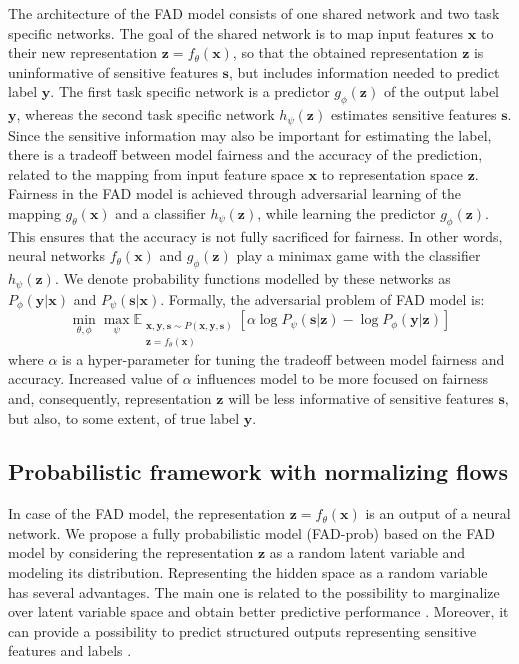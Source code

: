 \documentclass[preprint,12pt]{elsarticle}
\begin{document}
The architecture of the FAD model consists of one shared network and two task specific networks. The goal of the shared network is to map input features $\mathbf{x}$ to their new representation $\mathbf{z}=f_\theta(\mathbf{x})$, so that the obtained representation $\mathbf{z}$ is uninformative of sensitive features $\mathbf{s}$, but includes information needed to predict label $\mathbf{y}$. The first task specific network is a predictor $g_\phi(\mathbf{z})$ of the output label $\mathbf{y}$, whereas the second task specific network $h_\psi(\mathbf{z})$ estimates sensitive features $\mathbf{s}$. Since the sensitive information may also be important for estimating the label, there is a tradeoff between model fairness and the accuracy of the prediction, related to the mapping from input feature space $\mathbf{x}$ to representation space $\mathbf{z}$.
Fairness in the FAD model is achieved through adversarial learning of the mapping $g_\theta(\mathbf{x})$ and a classifier $h_\psi(\mathbf{z})$, while learning the predictor $g_\phi(\mathbf{z})$. This ensures that the accuracy is not fully sacrificed for fairness. In other words, neural networks $f_\theta(\mathbf{x})$ and $g_\phi(\mathbf{z})$ play a minimax game with the classifier $h_\psi(\mathbf{z})$. We denote probability functions modelled by these networks as $P_\phi(\mathbf{y}|\mathbf{x})$ and $P_\psi(\mathbf{s}|\mathbf{x})$. Formally, the adversarial problem of FAD model is:
$$\min_{\theta,\phi}\max_{\psi} \mathbb{E}_{\substack{\mathbf{x},\mathbf{y},\mathbf{s} \sim P(\mathbf{x},\mathbf{y},\mathbf{s})\\\mathbf{z}=f_\theta(\mathbf{x})}} \left[\alpha\log P_{\psi}(\mathbf{s}|\mathbf{z}) - \log P_{\phi}(\mathbf{y}|\mathbf{z})\right]$$
where $\alpha$ is a hyper-parameter for tuning the tradeoff between model fairness and accuracy. Increased value of $\alpha$ influences model to be more focused on fairness and, consequently, representation $\mathbf{z}$ will be less informative of sensitive features $\mathbf{s}$, but also, to some extent, of true label $\mathbf{y}$.

\subsection{Probabilistic framework with normalizing flows}
\label{Sec:advenet-nf}
In case of the FAD model, the representation $\mathbf{z}=f_\theta(\mathbf{x})$ is an output of a neural network. We propose a fully probabilistic model (FAD-prob) based on the FAD model by considering the representation $\mathbf{z}$ as a random latent variable and modeling its distribution. Representing the hidden space as a random variable has several advantages. The main one is related to the possibility to marginalize over latent variable space and obtain better predictive performance \cite{tan2010social}. Moreover, it can provide a possibility to predict structured outputs representing sensitive features and labels \cite{koller2009probabilistic}.
\end{document}
